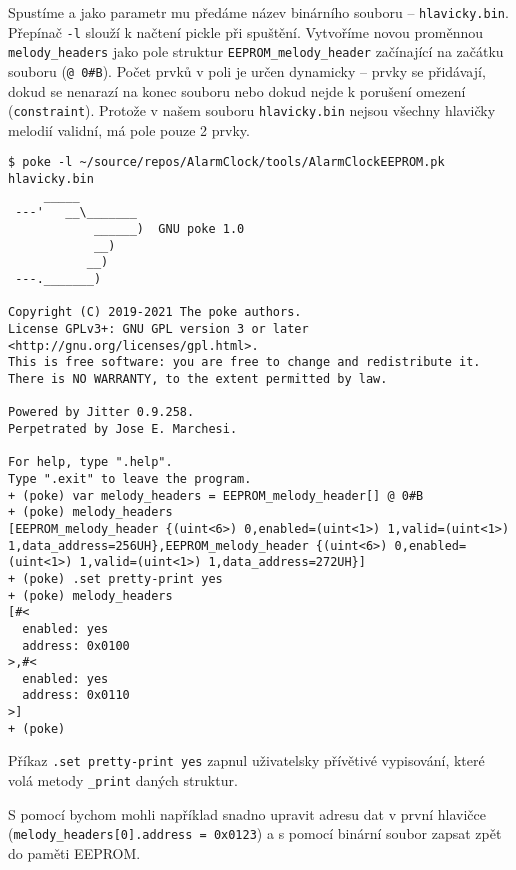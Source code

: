 Spustíme  a jako parametr mu předáme název binárního souboru --
\texttt{hlavicky.bin}. Přepínač \texttt{-l} slouží k načtení pickle při
spuštění. Vytvoříme novou proměnnou \verb|melody_headers| jako pole struktur
\verb|EEPROM_melody_header| začínající na začátku souboru (\verb|@ 0#B|). Počet
prvků v poli je určen dynamicky -- prvky se přidávají, dokud se nenarazí na
konec souboru nebo dokud nejde k porušení omezení (\texttt{constraint}).
Protože v našem souboru \texttt{hlavicky.bin} nejsou všechny hlavičky melodií
validní, má pole pouze 2 prvky.
\begin{lstlisting}[style=terminal]
$ poke -l ~/source/repos/AlarmClock/tools/AlarmClockEEPROM.pk hlavicky.bin
     _____
 ---'   __\_______
            ______)  GNU poke 1.0
            __)
           __)
 ---._______)

Copyright (C) 2019-2021 The poke authors.
License GPLv3+: GNU GPL version 3 or later <http://gnu.org/licenses/gpl.html>.
This is free software: you are free to change and redistribute it.
There is NO WARRANTY, to the extent permitted by law.

Powered by Jitter 0.9.258.
Perpetrated by Jose E. Marchesi.

For help, type ".help".
Type ".exit" to leave the program.
+ (poke) var melody_headers = EEPROM_melody_header[] @ 0#B
+ (poke) melody_headers
[EEPROM_melody_header {(uint<6>) 0,enabled=(uint<1>) 1,valid=(uint<1>) 1,data_address=256UH},EEPROM_melody_header {(uint<6>) 0,enabled=(uint<1>) 1,valid=(uint<1>) 1,data_address=272UH}]
+ (poke) .set pretty-print yes
+ (poke) melody_headers
[#<
  enabled: yes
  address: 0x0100
>,#<
  enabled: yes
  address: 0x0110
>]
+ (poke)
\end{lstlisting}
Příkaz \verb|.set pretty-print yes| zapnul uživatelsky přívětivé vypisování,
které volá metody \verb|_print| daných struktur.

S pomocí  bychom mohli například snadno upravit adresu dat v
první hlavičce (\verb|melody_headers[0].address = 0x0123|) a s pomocí
 binární soubor zapsat zpět do paměti EEPROM.


